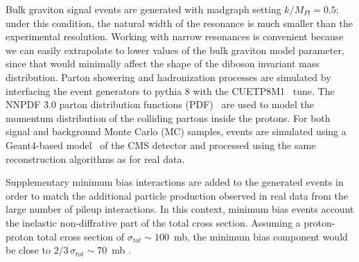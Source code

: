 Bulk graviton signal events are generated with {\sc madgraph} setting $k/M_{Pl} = 0.5$; 
under this condition, the natural width of the resonance is much smaller than the experimental resolution. Working with narrow resonances is convenient because we can easily extrapolate to lower values of the bulk graviton model parameter, since that would minimally affect the shape of the diboson invariant mass distribution.
Parton showering and hadronization processes are simulated by interfacing the event generators to {\sc pythia} 8 with the CUETP8M1~\cite{Skands:2014pea} tune.
The NNPDF 3.0 parton distribution functions (PDF)~\cite{Ball2015} are used to model the momentum distribution of the colliding partons inside the protons. For both signal and background Monte Carlo (MC) samples, events are simulated using a {\sc Geant4}-based model~\cite{GEANT4} of the CMS detector and processed using the same reconstruction algorithms as for real data. 

Supplementary minimum bias interactions are added to the generated events in order to match the additional particle production observed in real data from the large number of pileup interactions. In this context, minimum bias events account the inelastic non-diffrative part of the total cross section. Assuming a proton-proton total cross section of $\sigma_{tot} \sim 100$~mb, the minimum bias component would be close to $2/3\,\sigma_{tot} \sim 70$~mb \cite{CMS-PAS-FSQ-15-005}.



